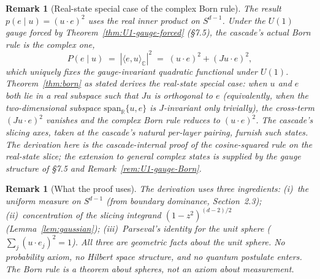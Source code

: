 \documentclass[12pt,a4paper]{article}
\newtheorem{remark}[theorem]{Remark}
\begin{document}
\begin{remark}[Real-state special case of the complex Born rule]\label{rem:born-real-special-case}
The result $p(e\mid u) = (u\cdot e)^2$ uses the real inner product on
$S^{d-1}$. Under the $U(1)$ gauge forced by
Theorem~\ref{thm:U1-gauge-forced} (\S7.5), the cascade's actual Born
rule is the complex one,
\[
P(e\mid u) \;=\; |\langle e, u\rangle_{\mathbb{C}}|^2
\;=\; (u\cdot e)^2 + (Ju\cdot e)^2,
\]
which uniquely fixes the gauge-invariant quadratic functional under
$U(1)$. Theorem~\ref{thm:born} as stated derives the
\emph{real-state special case}: when $u$ and $e$ both lie in a real
subspace such that $J u$ is orthogonal to $e$ (equivalently, when
the two-dimensional subspace $\mathrm{span}_{\mathbb{R}}\{u, e\}$ is
$J$-invariant only trivially), the cross-term $(Ju\cdot e)^2$ vanishes
and the complex Born rule reduces to $(u\cdot e)^2$. The cascade's
slicing axes, taken at the cascade's natural per-layer pairing,
furnish such states. The derivation here is the cascade-internal
proof of the cosine-squared rule on the real-state slice; the
extension to general complex states is supplied by the gauge
structure of \S7.5 and Remark~\ref{rem:U1-gauge-Born}.
\end{remark}

\begin{remark}[What the proof uses]
The derivation uses three ingredients: (i)~the uniform measure on $S^{d-1}$ (from boundary
dominance, Section~2.3); (ii)~concentration of the slicing integrand $(1-z^2)^{(d-2)/2}$
(Lemma~\ref{lem:gaussian}); (iii)~Parseval's identity for the unit sphere
($\sum_j(u\cdot e_j)^2 = 1$). All three are geometric facts about the unit sphere. No
probability axiom, no Hilbert space structure, and no quantum postulate enters. The Born
rule is a theorem about spheres, not an axiom about measurement.
\end{remark}
\end{document}
